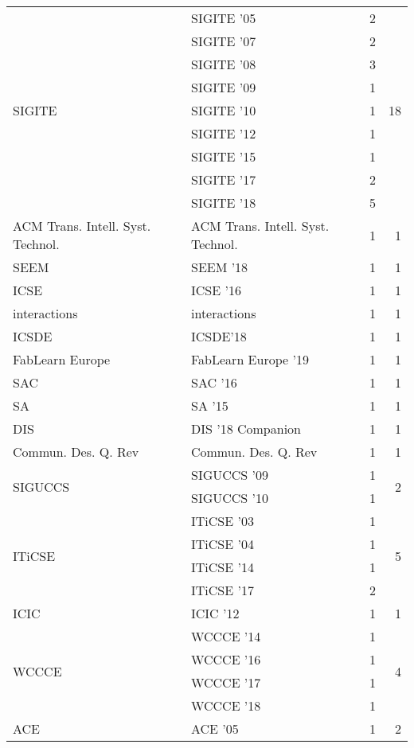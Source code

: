 \begin{table*}[t]
\begin{tabular}{llrr}
\multirow{9}{*}{SIGITE } & SIGITE '05 & 2 & \multirow{9}{*}{18}\\
& SIGITE '07 & 2 &\\
& SIGITE '08 & 3 &\\
& SIGITE '09 & 1 &\\
& SIGITE '10 & 1 &\\
& SIGITE '12 & 1 &\\
& SIGITE '15 & 1 &\\
& SIGITE '17 & 2 &\\
& SIGITE '18 & 5 &\\
\multirow{1}{*}{ACM Trans. Intell. Syst. Technol.} & ACM Trans. Intell. Syst. Technol. & 1 & \multirow{1}{*}{1}\\
\multirow{1}{*}{SEEM } & SEEM '18 & 1 & \multirow{1}{*}{1}\\
\multirow{1}{*}{ICSE } & ICSE '16 & 1 & \multirow{1}{*}{1}\\
\multirow{1}{*}{interactions} & interactions & 1 & \multirow{1}{*}{1}\\
\multirow{1}{*}{ICSDE} & ICSDE'18 & 1 & \multirow{1}{*}{1}\\
\multirow{1}{*}{FabLearn Europe } & FabLearn Europe '19 & 1 & \multirow{1}{*}{1}\\
\multirow{1}{*}{SAC } & SAC '16 & 1 & \multirow{1}{*}{1}\\
\multirow{1}{*}{SA } & SA '15 & 1 & \multirow{1}{*}{1}\\
\multirow{1}{*}{DIS } & DIS '18 Companion & 1 & \multirow{1}{*}{1}\\
\multirow{1}{*}{Commun. Des. Q. Rev} & Commun. Des. Q. Rev & 1 & \multirow{1}{*}{1}\\
\multirow{2}{*}{SIGUCCS } & SIGUCCS '09 & 1 & \multirow{2}{*}{2}\\
& SIGUCCS '10 & 1 &\\
\multirow{4}{*}{ITiCSE } & ITiCSE '03 & 1 & \multirow{4}{*}{5}\\
& ITiCSE '04 & 1 &\\
& ITiCSE '14 & 1 &\\
& ITiCSE '17 & 2 &\\
\multirow{1}{*}{ICIC } & ICIC '12 & 1 & \multirow{1}{*}{1}\\
\multirow{4}{*}{WCCCE } & WCCCE '14 & 1 & \multirow{4}{*}{4}\\
& WCCCE '16 & 1 &\\
& WCCCE '17 & 1 &\\
& WCCCE '18 & 1 &\\
\multirow{2}{*}{ACE } & ACE '05 & 1 & \multirow{2}{*}{2}\\

\end{tabular}
\end{table*}
